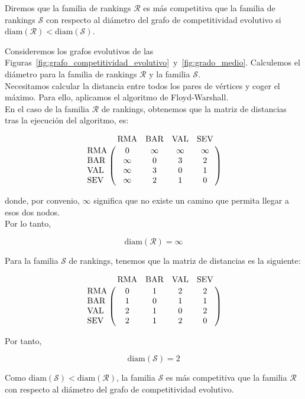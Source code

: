 \begin{defi}
Diremos que la familia de rankings $\mathcal{R}$ es más competitiva que la familia de rankings $\mathcal{S}$ con respecto al diámetro del grafo de competitividad evolutivo si $\mathrm{diam}(\mathcal{R}) < \mathrm{diam}(\mathcal{S})$.
\end{defi}

\begin{ejemplo}
Consideremos los grafos evolutivos de las Figuras~\ref{fig:grafo_competitividad_evolutivo}~y~\ref{fig:grado_medio}. Calculemos el diámetro para la familia de rankings $\mathcal{R}$ y la familia $\mathcal{S}$.\\

Necesitamos calcular la distancia entre todos los pares de vértices y coger el máximo. Para ello, aplicamos el algoritmo de Floyd-Warshall.\\

En el caso de la familia $\mathcal{R}$ de rankings, obtenemos que la matriz de distancias tras la ejecución del algoritmo, es:


\begin{equation*}
\bordermatrix{
	& \text{RMA} & \text{BAR} & \text{VAL} & \text{SEV} \cr
	\text{RMA} &	0 & \infty & \infty & \infty \cr
	\text{BAR} & \infty & 0 & 3 & 2 \cr
	\text{VAL} & \infty & 3 & 0 & 1 \cr
	\text{SEV} & \infty & 2 & 1 & 0 \cr
}
\end{equation*}


donde, por convenio, $\infty$ significa que no existe un camino que permita llegar a esos dos nodos.\\

Por lo tanto,

\begin{equation*}
\mathrm{diam}(\mathcal{R}) = \infty
\end{equation*}

Para la familia $\mathcal{S}$ de rankings, tenemos que la matriz de distancias es la siguiente:

\begin{equation*}
\bordermatrix{
	& \text{RMA} & \text{BAR} & \text{VAL} & \text{SEV} \cr
	\text{RMA} & 0 & 1 & 2 & 2 \cr
	\text{BAR} & 1 & 0 & 1 & 1 \cr
	\text{VAL} & 2 & 1 & 0 & 2 \cr
	\text{SEV} & 2 & 1 & 2 & 0 \cr
}
\end{equation*}

Por tanto, 

\begin{equation*}
\mathrm{diam}(\mathcal{S}) = 2
\end{equation*}

Como $\mathrm{diam}(\mathcal{S}) < \mathrm{diam}(\mathcal{R})$, la familia $\mathcal{S}$ es más competitiva que la familia $\mathcal{R}$ con respecto al diámetro del grafo de competitividad evolutivo.

\end{ejemplo}


